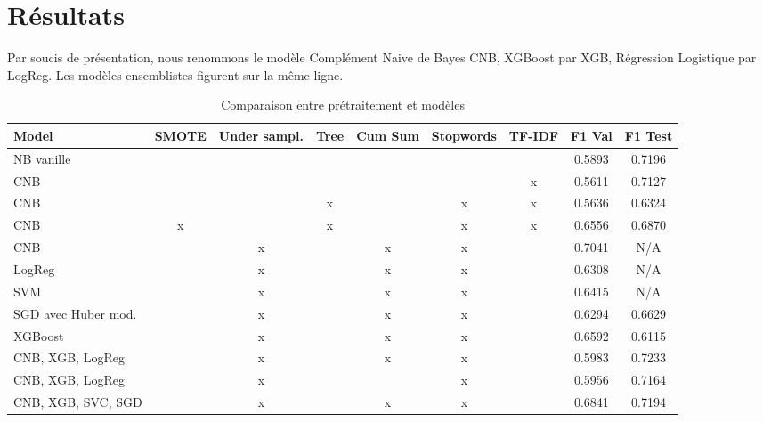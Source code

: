 \documentclass{article}
\begin{document}
\section{Résultats}
Par soucis de présentation, nous renommons le modèle Complément Naive de Bayes CNB, XGBoost par XGB, Régression Logistique par LogReg. Les modèles ensemblistes figurent sur la même ligne.
\begin{table}[H]
    \centering
    \begin{tabular}{|l|c|c|c|c|c|c|c|c|}
        \hline
        \textbf{Model} & \textbf{SMOTE} & \textbf{Under sampl.} & \textbf{Tree} &
        \textbf{Cum Sum} & \textbf{Stopwords} & \textbf{TF-IDF} &
        \textbf{F1 Val} & 
        \textbf{F1 Test} \\
        \hline
        NB vanille &  &  &  &  &  &  & 0.5893 & 0.7196\\
        CNB &  &  &  &  &  & x & 0.5611 & 0.7127\\
        CNB &  &  & x &  & x & x & 0.5636 & 0.6324\\
        CNB & x &  & x &  & x & x & 0.6556 & 0.6870\\
        CNB &  & x &  & x & x &  & 0.7041 & N/A\\
        LogReg &  & x &  & x & x &  & 0.6308 & N/A\\
        SVM &  & x &  & x & x &  & 0.6415 & N/A\\
        SGD avec Huber mod. &  & x &  & x & x &  & 0.6294 & 0.6629\\
        XGBoost &  & x &  & x & x &  & 0.6592 & 0.6115\\
        CNB, XGB, LogReg &  & x &  & x & x &  & 0.5983 & 0.7233\\
        CNB, XGB, LogReg &  & x &  &  & x &  & 0.5956 & 0.7164\\
        CNB, XGB, SVC, SGD &  & x &  & x & x &  & 0.6841 & 0.7194\\
        \hline
    \end{tabular}
    \caption{Comparaison entre prétraitement et modèles}
    \label{tab:model_comparison}
\end{table}
\end{document}
